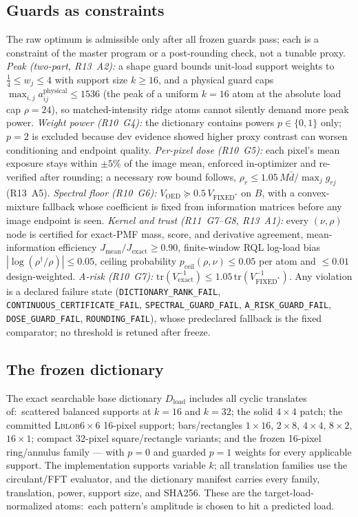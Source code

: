 \documentclass[10pt]{article}
\newcommand{\Jex}{J_{\mathrm{exact}}}
\begin{document}
\subsection{Guards as constraints}
The raw optimum is admissible only after all frozen guards pass; each is a
constraint of the master program or a post-rounding check, not a tunable
proxy. \emph{Peak (two-part, R13~A2):} a shape guard bounds unit-load support
weights to $\tfrac14 \le w_j \le 4$ with support size $k \ge 16$, and a
physical guard caps $\max_{i,j} a^{\mathrm{physical}}_{ij} \le 1536$ (the peak
of a uniform $k=16$ atom at the absolute load cap $\rho = 24$), so
matched-intensity ridge atoms cannot silently demand more peak power.
\emph{Weight power (R10~G4):} the dictionary contains powers $p\in\{0,1\}$
only; $p=2$ is excluded because dev evidence showed higher proxy contrast can
worsen conditioning and endpoint quality. \emph{Per-pixel dose (R10~G5):}
each pixel's mean exposure stays within $\pm5\%$ of the image mean, enforced
in-optimizer and re-verified after rounding; a necessary row bound follows,
$\rho_r \le 1.05\,M\bar d/\max_j g_{rj}$ (R13~A5). \emph{Spectral floor
(R10~G6):} $V_{\mathrm{OED}} \succeq 0.5\,V_{\text{FIXED}^\ast}$ on $B$, with a
convex-mixture fallback whose coefficient is fixed from information matrices
before any image endpoint is seen. \emph{Kernel and trust (R11~G7--G8,
R13~A1):} every $(\nu,\rho)$ node is certified for exact-PMF mass, score, and
derivative agreement, mean-information efficiency
$J_{\mathrm{mean}}/\Jex \ge 0.90$, finite-window RQL log-load bias
$|\log(\rho^{\dagger}/\rho)| \le 0.05$, ceiling probability
$p_{\mathrm{ceil}}(\rho,\nu)\le 0.05$ per atom and $\le 0.01$ design-weighted.
\emph{A-risk (R10~G7):} $\mathrm{tr}(V_{\mathrm{exact}}^{-1}) \le 1.05\,
\mathrm{tr}(V_{\text{FIXED}^\ast}^{-1})$. Any violation is a declared failure
state (\texttt{DICTIONARY\_RANK\_FAIL}, \texttt{CONTINUOUS\_CERTIFICATE\_FAIL},
\texttt{SPECTRAL\_GUARD\_FAIL}, \texttt{A\_RISK\_GUARD\_FAIL},
\texttt{DOSE\_GUARD\_FAIL}, \texttt{ROUNDING\_FAIL}), whose predeclared
fallback is the fixed comparator; no threshold is retuned after freeze.

\subsection{The frozen dictionary}
\label{sec:s-dict}
The exact searchable base dictionary $D_{\mathrm{load}}$ includes all cyclic
translates of:\ scattered balanced supports at $k=16$ and $k=32$; the solid
$4\times4$ patch; the committed \textsc{Lblob}$6\times6$ 16-pixel support;
bars/rectangles $1\times16$, $2\times8$, $4\times4$, $8\times2$,
$16\times1$; compact 32-pixel square/rectangle variants; and the frozen
16-pixel ring/annulus family --- with $p=0$ and guarded $p=1$ weights for
every applicable support. The implementation supports variable $k$; all
translation families use the circulant/FFT evaluator, and the dictionary
manifest carries every family, translation, power, support size, and
SHA256. These are the target-load-normalized atoms:\ each pattern's amplitude
is chosen to hit a predicted load.
\end{document}
